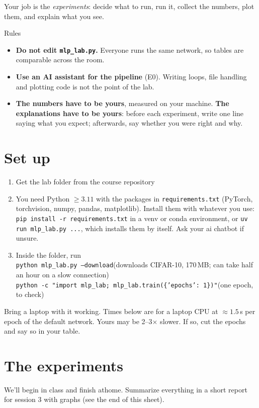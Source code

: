 \documentclass[11pt]{article}
\newcommand{\code}[1]{\texttt{#1}}
\newcounter{exp}
\begin{document}
Your job is the \emph{experiments}: decide what to run, run it, collect the numbers, plot them, and explain what you see.

\begin{rules}{Rules}
\begin{itemize}
  \item \textbf{Do not edit \code{mlp\_lab.py}.} Everyone runs the same network, so tables are comparable across the room.
  \item \textbf{Use an AI assistant for the pipeline} (E0). Writing loops, file handling and plotting code is not the point of the lab.
  \item \textbf{The numbers have to be yours}, measured on your machine. \textbf{The explanations have to be yours}: before each experiment, write one line saying what you expect; afterwards, say whether you were right and why.
\end{itemize}
\end{rules}

\section*{Set up}
\begin{enumerate}
  \item Get the lab folder from the course repository 
  \item You need Python $\ge3.11$ with the packages in \code{requirements.txt} (PyTorch, torchvision, numpy, pandas, matplotlib). Install them with whatever you use: \code{pip install -r requirements.txt} in a venv or conda environment, or \code{uv run mlp\_lab.py ...}, which installs them by itself. Ask your ai chatbot if unsure.
  \item Inside the folder, run\\
  \code{python mlp\_lab.py --download}\quad (downloads CIFAR-10, 170\,MB; can take half an hour on a slow connection)\\
  \code{python -c "import mlp\_lab; mlp\_lab.train(\{'epochs': 1\})"}\quad (one epoch, to check)
\end{enumerate}
Bring a laptop with it working.
Times below are for a laptop CPU at $\approx1.5$\,s per epoch of the default network. Yours may be 2--3$\times$ slower. If so, cut the epochs and say so in your table.

\section*{The experiments}
\setcounter{exp}{-1}
We'll begin in class and finish athome. Summarize everything in a short report for session 3 with graphs (see the end of this sheet).
\end{document}
